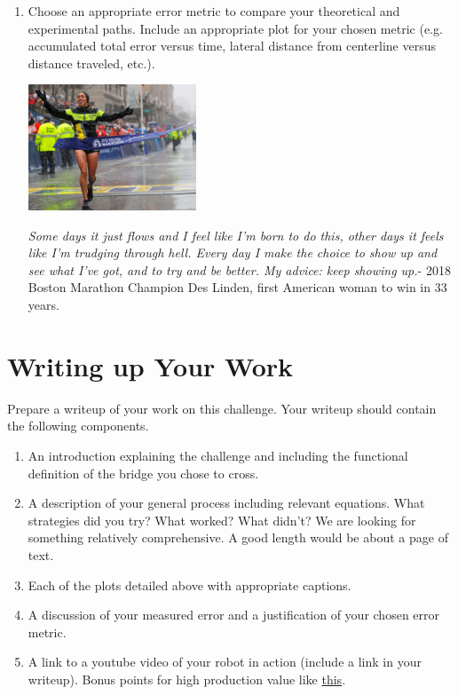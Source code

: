 \documentclass{tufte-handout}
\begin{document}
\begin{enumerate}[series=Deliverable, label=\textbf{Deliverable} (\arabic*)]
\item Choose an appropriate error metric to compare your theoretical and experimental paths. Include an appropriate plot for your chosen metric (e.g. accumulated total error versus time, lateral distance from centerline versus distance traveled, etc.).

\begin{marginfigure}
\includegraphics[width=5cm]{figures/linden2.jpg}
\caption{\emph{Some days it just flows and I feel like I'm born to do this, other days it feels like I'm trudging through hell. Every day I make the choice to show up and see what I've got, and to try and be better. My advice: keep showing up.}- 2018 Boston Marathon Champion Des Linden, first American woman to win in 33 years.}
\end{marginfigure}

\end{enumerate}

\section{Writing up Your Work}
Prepare a writeup of your work on this challenge.  Your writeup should contain the following components.
\begin{enumerate}
\item An introduction explaining the challenge and including the functional definition of the bridge you chose to cross.
\item A description of your general process including relevant equations.  What strategies did you try?  What worked?  What didn't?  We are looking for something relatively comprehensive.  A good length would be about a page of text. 
\item Each of the plots detailed above with appropriate captions. 
\item A discussion of your measured error and a justification of your chosen error metric.
\item A link to a youtube video of your robot in action (include a link in your writeup). Bonus points for high production value like \href{https://www.youtube.com/watch?v=9zWqHOggKSs}{this}.
\end{enumerate}
\end{document}
